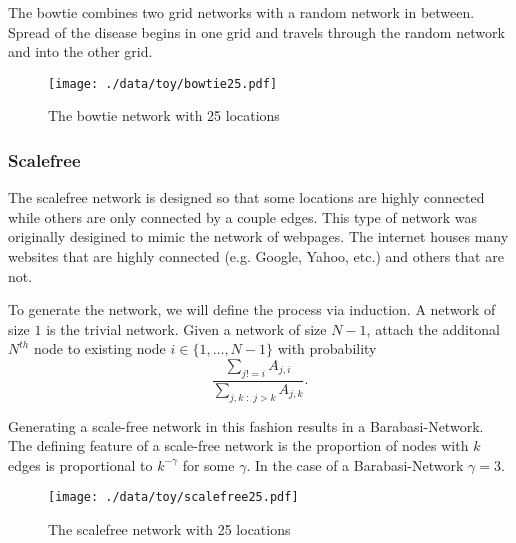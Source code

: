 \documentclass[11pt]{article}
\begin{document}
The bowtie combines two grid networks with a random network in
between.  Spread of the disease begins in one grid and travels through
the random network and into the other grid.

\begin{figure}[htb]
\centering
\texttt{[image: ./data/toy/bowtie25.pdf]}
\caption{\label{fig:bowtie25}The bowtie network with 25 locations}
\end{figure}


\subsubsection{Scalefree}
\label{sec-1-3-6}

The scalefree network is designed so that some locations are highly
connected while others are only connected by a couple edges.  This
type of network was originally desigined to mimic the network of
webpages.  The internet houses many websites that are highly
connected (e.g. Google, Yahoo, etc.) and others that are not.

To generate the network, we will define the process via induction.  A
network of size $1$ is the trivial network.  Given a network of size
$N-1$, attach the additonal $N^{th}$ node to existing node $i \in
\lbrace 1,\ldots,N-1\rbrace$ with probability
\begin{equation*}
  \frac{\sum_{j!=i} A_{j,i}}{\sum_{j,k \;:\; j > k} A_{j,k}}.
\end{equation*}

Generating a scale-free network in this fashion results in a
Barabasi-Network.  The defining feature of a scale-free network is the
proportion of nodes with $k$ edges is proportional to $k^{-\gamma}$
for some $\gamma$.  In the case of a Barabasi-Network $\gamma = 3$.


\begin{figure}[htb]
\centering
\texttt{[image: ./data/toy/scalefree25.pdf]}
\caption{\label{fig:scalefree25}The scalefree network with 25 locations}
\end{figure}
\end{document}
